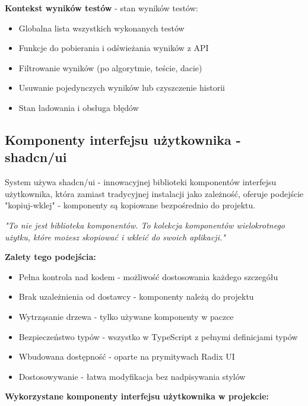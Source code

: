 \documentclass[12pt,a4paper]{article}
\begin{document}
\textbf{Kontekst wyników testów} - stan wyników testów:
\begin{itemize}
    \item Globalna lista wszystkich wykonanych testów
    \item Funkcje do pobierania i odświeżania wyników z API
    \item Filtrowanie wyników (po algorytmie, teście, dacie)
    \item Usuwanie pojedynczych wyników lub czyszczenie historii
    \item Stan ładowania i obsługa błędów
\end{itemize}

\subsection{Komponenty interfejsu użytkownika - shadcn/ui}

System używa shadcn/ui - innowacyjnej biblioteki komponentów interfejsu użytkownika, która zamiast tradycyjnej instalacji jako zależność, oferuje podejście "kopiuj-wklej" - komponenty są kopiowane bezpośrednio do projektu.

\begin{tcolorbox}[colback=yellow!5!white,colframe=yellow!75!black,title=Filozofia shadcn/ui]
\textit{"To nie jest biblioteka komponentów. To kolekcja komponentów wielokrotnego użytku, które możesz skopiować i wkleić do swoich aplikacji."}

\textbf{Zalety tego podejścia:}
\begin{itemize}
    \item Pełna kontrola nad kodem - możliwość dostosowania każdego szczegółu
    \item Brak uzależnienia od dostawcy - komponenty należą do projektu
    \item Wytrząsanie drzewa - tylko używane komponenty w paczce
    \item Bezpieczeństwo typów - wszystko w TypeScript z pełnymi definicjami typów
    \item Wbudowana dostępność - oparte na prymitywach Radix UI
    \item Dostosowywanie - łatwa modyfikacja bez nadpisywania stylów
\end{itemize}
\end{tcolorbox}

\textbf{Wykorzystane komponenty interfejsu użytkownika w projekcie:}
\end{document}

